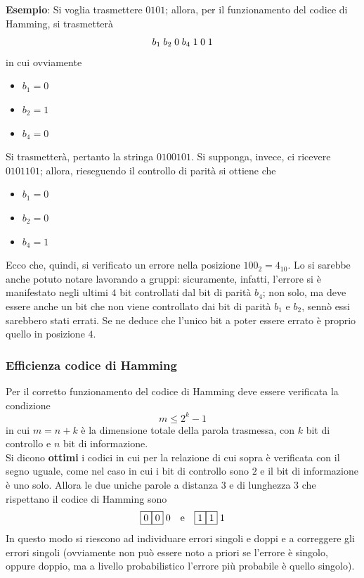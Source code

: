 \documentclass[a4paper]{extarticle}
\begin{document}
\vspace{2em}
\noindent
\textbf{Esempio}: Si voglia trasmettere $0101$; allora, per il funzionamento del codice di Hamming, si trasmetterà
\[b_1 \hspace{0.25em} b_2 \hspace{0.25em} 0 \hspace{0.25em}b_4 \hspace{0.25em}1 \hspace{0.25em}0 \hspace{0.25em}1\]
in cui ovviamente
\begin{itemize}
    \item $b_1=0$
    \item $b_2=1$
    \item $b_4=0$
\end{itemize}
Si trasmetterà, pertanto la stringa $0100101$. Si supponga, invece, ci ricevere $0101101$; allora, rieseguendo il controllo di parità si ottiene che
\begin{itemize}
    \item $b_1=0$
    \item $b_2=0$
    \item $b_4=1$
\end{itemize}
Ecco che, quindi, si verificato un errore nella posizione $100_2=4_{10}$. Lo si sarebbe anche potuto notare lavorando a gruppi: sicuramente, infatti, l'errore si è manifestato negli ultimi $4$ bit controllati dal bit di parità $b_4$; non solo, ma deve essere anche un bit che non viene controllato dai bit di parità $b_1$ e $b_2$, sennò essi sarebbero stati errati. Se ne deduce che l'unico bit a poter essere errato è proprio quello in posizione $4$.

\vspace{1em}
\subsubsection{Efficienza codice di Hamming}
Per il corretto funzionamento del codice di Hamming deve essere verificata la condizione
\[m \leq 2^k-1\]
in cui $m=n+k$ è la dimensione totale della parola trasmessa, con $k$ bit di controllo e $n$ bit di informazione.\\
Si dicono \textbf{ottimi} i codici in cui per la relazione di cui sopra è verificata con il segno uguale, come nel caso in cui i bit di controllo sono $2$ e il bit di informazione è uno solo. Allora le due uniche parole a distanza $3$ e di lunghezza $3$ che rispettano il codice di Hamming sono
\[\boxed{0}\boxed{0} \hspace{0.25em} 0 \hspace{1em} \text{e} \hspace{1em} \boxed{1}\boxed{1} \hspace{0.25em} 1\]
In questo modo si riescono ad individuare errori singoli e doppi e a correggere gli errori singoli (ovviamente non può essere noto a priori se l'errore è singolo, oppure doppio, ma a livello probabilistico l'errore più probabile è quello singolo).
\end{document}
